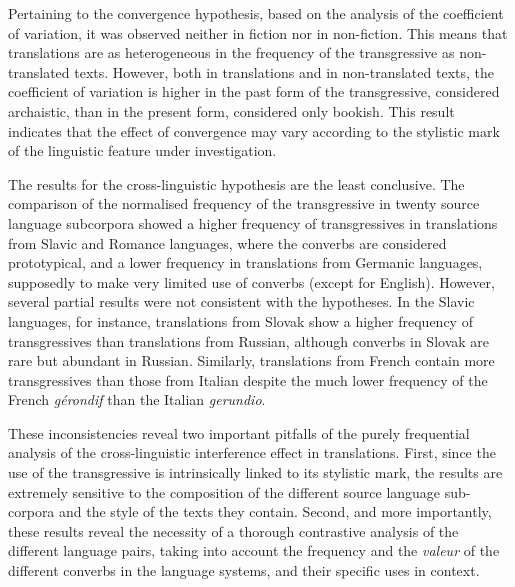 \documentclass[output=paper,russian]{langsci/langscibook}
\begin{document}
Pertaining to the convergence hypothesis, based on the analysis of the coefficient of variation, it was observed neither in fiction nor in non-fiction. This means that translations are as heterogeneous in the frequency of the transgressive as non-translated texts. However, both in translations and in non-translated texts, the coefficient of variation is higher in the past form of the transgressive, considered archaistic, than in the present form, considered only bookish. This result indicates that the effect of convergence may vary according to the stylistic mark of the linguistic feature under investigation.

The results for the cross-linguistic hypothesis are the least conclusive. The comparison of the normalised frequency of the transgressive in twenty source language subcorpora showed a higher frequency of transgressives in translations from Slavic and Romance languages, where the converbs are considered prototypical, and a lower frequency in translations from Germanic languages, supposedly to make very limited use of converbs (except for English). However, several partial results were not consistent with the hypotheses. In the Slavic languages, for instance, translations from Slovak show a higher frequency of transgressives than translations from Russian, although converbs in Slovak are rare but abundant in Russian. Similarly, translations from French contain more transgressives than those from Italian despite the much lower frequency of the French \textit{gérondif} than the Italian \textit{gerundio}. 

These inconsistencies reveal two important pitfalls of the purely frequential analysis of the cross-linguistic interference effect in translations. First, since the use of the transgressive is intrinsically linked to its stylistic mark, the results are extremely sensitive to the composition of the different source language sub-corpora and the style of the texts they contain. Second, and more importantly, these results reveal the necessity of a thorough contrastive analysis of the different language pairs, taking into account the frequency and the \textit{valeur} of the different converbs in the language systems, and their specific uses in context.
\end{document}
